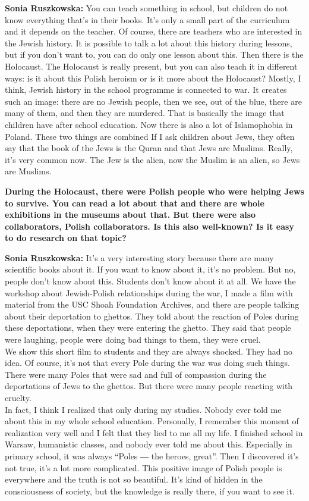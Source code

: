 \textbf{Sonia Ruszkowska:} You can teach something in school, but children do not know everything that’s in their books. It’s only a small part of the curriculum and it depends on the teacher. Of course, there are teachers who are interested in the Jewish history. It is possible to talk a lot about this history during lessons, but if you don’t want to, you can do only one lesson about this. Then there is the Holocaust. The Holocaust is really present, but you can also teach it in different ways: is it about this Polish heroism or is it more about the Holocaust? Mostly, I think, Jewish history in the school programme is connected to war. It creates such an image: there are no Jewish people, then we see, out of the blue, there are many of them, and then they are murdered. That is basically the image that children have after school education. Now there is also a lot of Islamophobia in Poland. These two things are combined If I ask children about Jews, they often say that the book of the Jews is the Quran and that Jews are Muslims. Really, it’s very common now. The Jew is the alien, now the Muslim is an alien, so Jews are Muslims.  

\textbf{During the Holocaust, there were Polish people who were helping Jews to survive. You can read a lot about that and there are whole exhibitions in the museums about that. But there were also collaborators, Polish collaborators. Is this also well-known? Is it easy to do research on that topic?} 

\textbf{Sonia Ruszkowska:} It’s a very interesting story because there are many scientific books about it. If you want to know about it, it’s no problem. But no, people don’t know about this. Students don’t know about it at all. We have the workshop about Jewish-Polish relationships during the war, I made a film with material from the USC Shoah Foundation Archives, and there are people talking about their deportation to ghettos. They told about the reaction of Poles during these deportations, when they were entering the ghetto. They said that people were laughing, people were doing bad things to them, they were cruel.\\ 
We show this short film to students and they are always shocked. They had no idea. Of course, it’s not that every Pole during the war was doing such things. There were many Poles that were sad and full of compassion during the deportations of Jews to the ghettos. But there were many people reacting with cruelty.\\ 
In fact, I think I realized that only during my studies. Nobody ever told me about this in my whole school education. Personally, I remember this moment of realization very well and I felt that they lied to me all my life. I finished school in Warsaw, humanistic classes, and nobody ever told me about this. Especially in primary school, it was always ``Poles ― the heroes, great''. Then I discovered it’s not true, it’s a lot more complicated. This positive image of Polish people is everywhere and the truth is not so beautiful. It’s kind of hidden in the consciousness of society, but the knowledge is really there, if you want to see it. 


